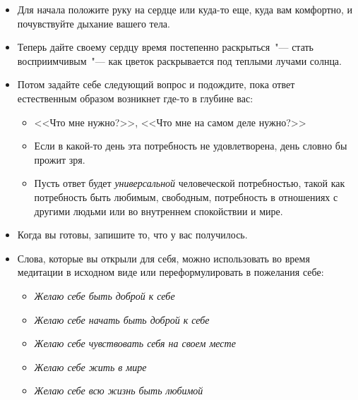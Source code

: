 \vspace{3ex}

\begin{itemize}
	\item Для начала положите руку на сердце или куда-то еще, куда вам комфортно, и почувствуйте дыхание вашего тела.
	
	\item Теперь дайте своему сердцу время постепенно раскрыться~"--- стать восприимчивым~"--- как цветок раскрывается под теплыми лучами солнца.
	
	\item Потом задайте себе следующий вопрос и подождите, пока ответ естественным образом возникнет где-то в глубине вас:
	
	\begin{itemize}
		\item <<Что мне нужно?>>, <<Что мне на самом деле нужно?>>
		
		\item Если в какой-то день эта потребность не удовлетворена, день словно бы прожит зря.
		
		\item Пусть ответ будет \emph{универсальной} человеческой потребностью, такой как потребность быть любимым, свободным, потребность в отношениях с другими людьми или во внутреннем спокойствии и мире.
	\end{itemize}

	\item Когда вы готовы, запишите то, что у вас получилось.
	
	\item Слова, которые вы открыли для себя, можно использовать во время медитации в исходном виде или переформулировать в пожелания себе:
	
	\begin{itemize}
		\item \emph{Желаю себе быть доброй к себе}
		\item \emph{Желаю себе начать быть доброй к себе}
		\item \emph{Желаю себе чувствовать себя на своем месте}
		\item \emph{Желаю себе жить в мире}
		\item \emph{Желаю себе всю жизнь быть любимой} 
	\end{itemize}
\end{itemize}


